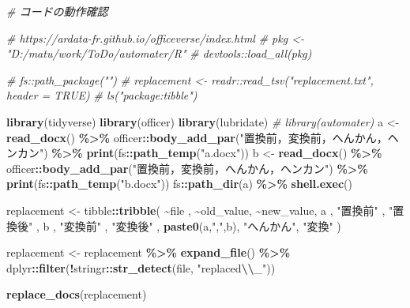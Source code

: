 \documentclass[
]{article}
\newenvironment{Shaded}{\begin{snugshade}}{\end{snugshade}}
\newcommand{\CommentTok}[1]{\textcolor[rgb]{0.56,0.35,0.01}{\textit{#1}}}
\newcommand{\FunctionTok}[1]{\textcolor[rgb]{0.13,0.29,0.53}{\textbf{#1}}}
\newcommand{\NormalTok}[1]{#1}
\newcommand{\OtherTok}[1]{\textcolor[rgb]{0.56,0.35,0.01}{#1}}
\newcommand{\SpecialCharTok}[1]{\textcolor[rgb]{0.81,0.36,0.00}{\textbf{#1}}}
\newcommand{\StringTok}[1]{\textcolor[rgb]{0.31,0.60,0.02}{#1}}
\begin{document}
\begin{Shaded}
\begin{Highlighting}[]
  \CommentTok{\# コードの動作確認}

  \CommentTok{\# https://ardata{-}fr.github.io/officeverse/index.html}
  \CommentTok{\# pkg \textless{}{-} "D:/matu/work/ToDo/automater/R"}
  \CommentTok{\# devtools::load\_all(pkg)}

  \CommentTok{\# fs::path\_package("")}
  \CommentTok{\# replacement \textless{}{-} readr::read\_tsv("replacement.txt", header = TRUE)}
  \CommentTok{\# ls("package:tibble")}

\FunctionTok{library}\NormalTok{(tidyverse)}
\FunctionTok{library}\NormalTok{(officer)}
\FunctionTok{library}\NormalTok{(lubridate)}
  \CommentTok{\# library(automater)}
\NormalTok{a }\OtherTok{\textless{}{-}} 
  \FunctionTok{read\_docx}\NormalTok{() }\SpecialCharTok{\%\textgreater{}\%}
\NormalTok{  officer}\SpecialCharTok{::}\FunctionTok{body\_add\_par}\NormalTok{(}\StringTok{"置換前，変換前，へんかん，ヘンカン"}\NormalTok{) }\SpecialCharTok{\%\textgreater{}\%}
  \FunctionTok{print}\NormalTok{(fs}\SpecialCharTok{::}\FunctionTok{path\_temp}\NormalTok{(}\StringTok{"a.docx"}\NormalTok{))}
\NormalTok{b }\OtherTok{\textless{}{-}} 
  \FunctionTok{read\_docx}\NormalTok{() }\SpecialCharTok{\%\textgreater{}\%}
\NormalTok{  officer}\SpecialCharTok{::}\FunctionTok{body\_add\_par}\NormalTok{(}\StringTok{"置換前，変換前，へんかん，ヘンカン"}\NormalTok{) }\SpecialCharTok{\%\textgreater{}\%}
  \FunctionTok{print}\NormalTok{(fs}\SpecialCharTok{::}\FunctionTok{path\_temp}\NormalTok{(}\StringTok{"b.docx"}\NormalTok{))}
\NormalTok{fs}\SpecialCharTok{::}\FunctionTok{path\_dir}\NormalTok{(a) }\SpecialCharTok{\%\textgreater{}\%}
  \FunctionTok{shell.exec}\NormalTok{()}

\NormalTok{replacement }\OtherTok{\textless{}{-}} 
\NormalTok{  tibble}\SpecialCharTok{::}\FunctionTok{tribble}\NormalTok{(}
    \SpecialCharTok{\textasciitilde{}}\NormalTok{file          , }\SpecialCharTok{\textasciitilde{}}\NormalTok{old\_value, }\SpecialCharTok{\textasciitilde{}}\NormalTok{new\_value,}
\NormalTok{    a              , }\StringTok{"置換前"}\NormalTok{  , }\StringTok{"置換後"}\NormalTok{  ,}
\NormalTok{    b              , }\StringTok{"変換前"}\NormalTok{  , }\StringTok{"変換後"}\NormalTok{  ,}
    \FunctionTok{paste0}\NormalTok{(a,}\StringTok{","}\NormalTok{,b), }\StringTok{"へんかん"}\NormalTok{, }\StringTok{"変換"}\NormalTok{    )}

\NormalTok{replacement }\OtherTok{\textless{}{-}} 
\NormalTok{  replacement }\SpecialCharTok{\%\textgreater{}\%}
  \FunctionTok{expand\_file}\NormalTok{() }\SpecialCharTok{\%\textgreater{}\%}
\NormalTok{  dplyr}\SpecialCharTok{::}\FunctionTok{filter}\NormalTok{(}\SpecialCharTok{!}\NormalTok{stringr}\SpecialCharTok{::}\FunctionTok{str\_detect}\NormalTok{(file, }\StringTok{"replaced}\SpecialCharTok{\textbackslash{}\textbackslash{}}\StringTok{\_"}\NormalTok{))}

\FunctionTok{replace\_docs}\NormalTok{(replacement)}
\end{Highlighting}
\end{Shaded}
\end{document}
